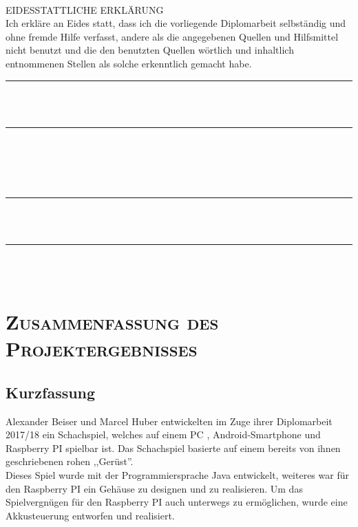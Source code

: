 \documentclass[12pt,a4paper]{article}
\begin{document}
	\hfill\\[ 8mm]
	EIDESSTATTLICHE ERKLÄRUNG
	\\[3mm]
	\noindent%
	Ich erkläre an Eides statt, dass ich die vorliegende Diplomarbeit selbständig und
	ohne fremde Hilfe verfasst, andere als die angegebenen Quellen und Hilfsmittel
	nicht benutzt und die den benutzten Quellen wörtlich und inhaltlich entnommenen
	Stellen als solche erkenntlich gemacht habe.
	\\[12mm]
	\parbox[b]{52mm}{
		\rule{50mm}{0.2pt}\rule{0pt}{25mm}
		\\\hspace*{6mm}{Ort, Datum}
		\\[0mm]
	}
	\hfill
	\parbox[b]{72mm}{
		\rule{70mm}{0.2pt}\rule{0pt}{25mm}
		\\\hspace*{6mm}{Verfasser, Verfasserinnen}
		\\\hspace*{6mm}{Vor- und Zunamen}
	}
		\\[12mm]
	\parbox[b]{52mm}{
		\rule{50mm}{0.2pt}\rule{0pt}{25mm}
		\\\hspace*{6mm}{Ort, Datum}
		\\[0mm]
	}
	\hfill
	\parbox[b]{72mm}{
		\rule{70mm}{0.2pt}\rule{0pt}{25mm}
		\\\hspace*{6mm}{Verfasser, Verfasserinnen}
		\\\hspace*{6mm}{Vor- und Zunamen}
	}






\newpage
\section{\scshape Zusammenfassung des Projektergebnisses}
 \subsection{Kurzfassung}
 
	Alexander Beiser und Marcel Huber entwickelten im Zuge ihrer Diplomarbeit 2017/18 ein Schachspiel, welches auf einem \ac{PC} , Android-Smartphone und Raspberry PI spielbar ist. Das Schachspiel basierte auf einem bereits von ihnen geschriebenen rohen ,,Gerüst''. \\
	Dieses Spiel wurde mit der Programmiersprache Java entwickelt, weiteres war für den Raspberry PI ein Gehäuse zu designen und zu realisieren. Um das Spielvergnügen für den Raspberry PI auch unterwegs zu ermöglichen, wurde eine Akkusteuerung entworfen und realisiert. \\
	
\end{document}
